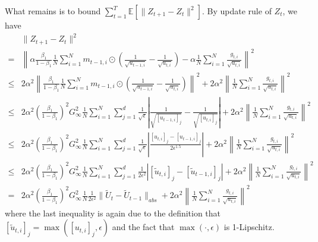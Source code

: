 \documentclass{article} %
\begin{document}
What remains is to bound $\sum_{t=1}^T \mathbb E\left[\| Z_{t+1}-  Z_{t}\|^2 \right]$. By update rule of $Z_t$, we have
\begin{align}
&\| Z_{t+1}-  Z_{t}\|^2  \nonumber \\
 = &  \left\| \alpha \frac{\beta_1}{1-\beta_1}  \frac{1}{N} \sum_{i=1}^N m_{t-1	,i} \odot (\frac{1}{\sqrt{u_{t-1,i}}} - \frac{1}{\sqrt{u_{t,i}}}) - \alpha \frac{1}{N} \sum_{i=1}^N \frac{g_{t,i}}{\sqrt{u_{t,i}}} \right\|^2 \nonumber \\
\leq & 2 \alpha^2 \left\|  \frac{\beta_1}{1-\beta_1}  \frac{1}{N} \sum_{i=1}^N m_{t-1	,i} \odot (\frac{1}{\sqrt{u_{t-1,i}}} - \frac{1}{\sqrt{u_{t,i}}})\right\|^2 + 2 \alpha^2 \left\| \frac{1}{N} \sum_{i=1}^N \frac{g_{t,i}}{\sqrt{u_{t,i}}} \right\|^2 \nonumber \\
\leq & 2 \alpha^2 \left ( \frac{\beta_1}{1-\beta_1} \right)^2    G_{\infty} ^2 \frac{1}{N} \sum_{i=1}^N \sum_{j=1}^d   \frac{1}{\sqrt{\epsilon}}\left|\frac{1}{\sqrt{[u_{t-1,i}]_j}} - \frac{1}{\sqrt{[u_{t,i}]_j}}\right| + 2 \alpha^2 \left\| \frac{1}{N} \sum_{i=1}^N \frac{g_{t,i}}{\sqrt{u_{t,i}}} \right\|^2 \nonumber \\
\leq & 2 \alpha^2 \left ( \frac{\beta_1}{1-\beta_1} \right)^2    G_{\infty} ^2 \frac{1}{N} \sum_{i=1}^N \sum_{j=1}^d   \frac{1}{\sqrt{\epsilon}}\left|\frac{[u_{t,i}]_j - [u_{t-1,i}]_j }{2\epsilon^{1.5}}\right| + 2 \alpha^2 \left\| \frac{1}{N} \sum_{i=1}^N \frac{g_{t,i}}{\sqrt{u_{t,i}}} \right\|^2 \nonumber \\
\leq & 2 \alpha^2 \left ( \frac{\beta_1}{1-\beta_1} \right)^2    G_{\infty} ^2 \frac{1}{N} \sum_{i=1}^N \sum_{j=1}^d   \frac{1}{{2\epsilon^2}}\left|{[\tilde u_{t,i}]_j - [\tilde u_{t-1,i}]_j }\right| + 2 \alpha^2 \left\| \frac{1}{N} \sum_{i=1}^N \frac{g_{t,i}}{\sqrt{u_{t,i}}} \right\|^2 \nonumber \\
= & 2 \alpha^2 \left ( \frac{\beta_1}{1-\beta_1} \right)^2    G_{\infty} ^2 \frac{1}{N}   \frac{1}{{2\epsilon^2}}\|\tilde U_t - \tilde U_{t-1} \|_{abs} + 2 \alpha^2 \left\| \frac{1}{N} \sum_{i=1}^N \frac{g_{t,i}}{\sqrt{u_{t,i}}} \right\|^2
\end{align}
where the last inequality is again due to the definition that $[\tilde u_{t,i}]_j = \max ([ u_{t,i}]_j ,\epsilon )$ and the fact that $\max(\cdot, \epsilon)$ is 1-Lipschitz. 
\end{document}
